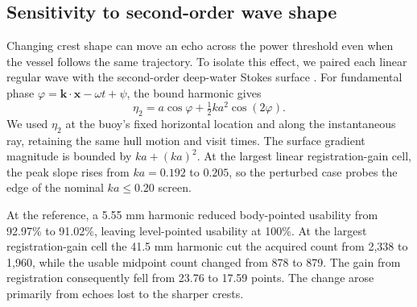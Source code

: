 \subsection{Sensitivity to second-order wave shape}
\label{sec:crest-sensitivity}

Changing crest shape can move an echo across the power threshold even when the vessel follows the same trajectory. To isolate this effect, we paired each linear regular wave with the second-order deep-water Stokes surface \cite{Chen2018StokesHarmonics}. For fundamental phase $\varphi=\mathbf{k}\cdot\mathbf{x}-\omega t+\psi$, the bound harmonic gives
\begin{equation}
 \eta_2=a\cos\varphi+\tfrac12 ka^2\cos(2\varphi).
\end{equation}
We used $\eta_2$ at the buoy's fixed horizontal location and along the instantaneous ray, retaining the same hull motion and visit times. The surface gradient magnitude is bounded by $ka+(ka)^2$. At the largest linear registration-gain cell, the peak slope rises from $ka=0.192$ to $0.205$, so the perturbed case probes the edge of the nominal $ka\le0.20$ screen.

At the reference, a 5.55 mm harmonic reduced body-pointed usability from 92.97\% to 91.02\%, leaving level-pointed usability at 100\%. At the largest registration-gain cell the 41.5 mm harmonic cut the acquired count from 2,338 to 1,960, while the usable midpoint count changed from 878 to 879. The gain from registration consequently fell from 23.76 to 17.59 points. The change arose primarily from echoes lost to the sharper crests.

